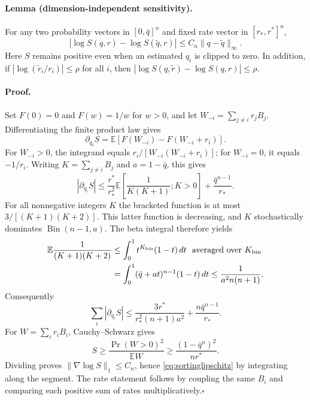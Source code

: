 \paragraph{Lemma (dimension-independent sensitivity).}
For any two probability vectors in $[0,\bar q]^n$ and fixed rate vector
in $[r_*,r^*]^n$,
\begin{equation}
 |\log S(q,r)-\log S(\widetilde q,r)|
       \le C_n\|q-\widetilde q\|_\infty.
 \label{eq:sortinglipschitz}
\end{equation}
Here $S$ remains positive even when an estimated $q_i$ is clipped to zero.
In addition, if $|\log(\widetilde r_i/r_i)|\le\rho$ for all $i$, then
$|\log S(q,\widetilde r)-\log S(q,r)|\le\rho$.

\paragraph{Proof.}
Set $F(0)=0$ and $F(w)=1/w$ for $w>0$, and let
$W_{-i}=\sum_{j\ne i}r_jB_j$.  Differentiating the finite product law gives
\[
 \partial_{q_i}S=\mathbb E[F(W_{-i})-F(W_{-i}+r_i)].
\]
For $W_{-i}>0$, the integrand equals
$r_i/[W_{-i}(W_{-i}+r_i)]$; for $W_{-i}=0$, it equals $-1/r_i$.
Writing $K=\sum_{j\ne i}B_j$ and $a=1-\bar q$, this gives
\[
 |\partial_{q_i}S|
 \le\frac{r^*}{r_*^2}
      \mathbb E\left[\frac1{K(K+1)};K>0\right]
       +\frac{\bar q^{n-1}}{r_*}.
\]
For all nonnegative integers $K$ the bracketed function is at most
$3/[(K+1)(K+2)]$.  This latter function is decreasing, and $K$
stochastically dominates $\operatorname{Bin}(n-1,a)$.  The beta integral
therefore yields
\begin{align*}
 \mathbb E\frac1{(K+1)(K+2)}
 &\le\int_0^1 t^{K_{\rm bin}}(1-t)\,dt\ \text{ averaged over }K_{\rm bin}\\
 &=\int_0^1(\bar q+at)^{n-1}(1-t)\,dt
 \le\frac1{a^2n(n+1)}.
\end{align*}
Consequently
\[
 \sum_i|\partial_{q_i}S|
 \le\frac{3r^*}{r_*^2(n+1)a^2}
           +\frac{n\bar q^{n-1}}{r_*}.
\]
For $W=\sum_i r_iB_i$, Cauchy--Schwarz gives
\[
 S\ge\frac{\Pr(W>0)^2}{\mathbb EW}
       \ge\frac{(1-\bar q^n)^2}{nr^*}.
\]
Dividing proves $\|\nabla\log S\|_1\le C_n$, hence
\eqref{eq:sortinglipschitz} by integrating along the segment.
The rate statement follows by coupling the same $B_i$ and comparing
each positive sum of rates multiplicatively.\hfill$\square$

